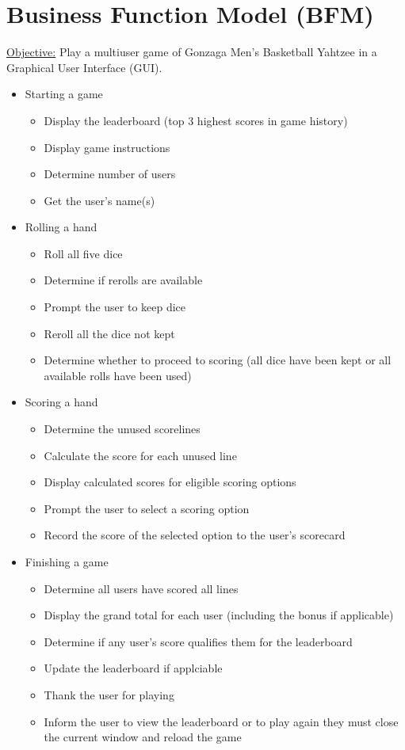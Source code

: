 \documentclass[]{report}   %
\begin{document}
\section{Business Function Model (BFM)}     %
\underline{Objective:} Play a multiuser game of Gonzaga Men's Basketball Yahtzee in a Graphical User Interface (GUI).

\begin{itemize}

\item Starting a game
	\begin{itemize}
	\item Display the leaderboard (top 3 highest scores in game history)
	\item Display game instructions
	\item Determine number of users
	\item Get the user's name(s)
	\end{itemize}

\item Rolling a hand
	\begin{itemize}
	\item Roll all five dice
	\item Determine if rerolls are available
	\item Prompt the user to keep dice
	\item Reroll all the dice not kept
	\item Determine whether to proceed to scoring (all dice have been kept or all available rolls have been used)
	\end{itemize}

\vspace{.7in}

\item Scoring a hand
	\begin{itemize}
	\item Determine the unused scorelines
	\item Calculate the score for each unused line
	\item Display calculated scores for eligible scoring options
	\item Prompt the user to select a scoring option
	\item Record the score of the selected option to the user's scorecard
	\end{itemize}

\item Finishing a game
	\begin{itemize}
	\item Determine all users have scored all lines
	\item Display the grand total for each user (including the bonus if applicable)
	\item Determine if any user's score qualifies them for the leaderboard
	\item Update the leaderboard if applciable
	\item Thank the user for playing
	\item Inform the user to view the leaderboard or to play again they must close the current window and reload the game
	\end{itemize}
	

\end{itemize}
\end{document}
